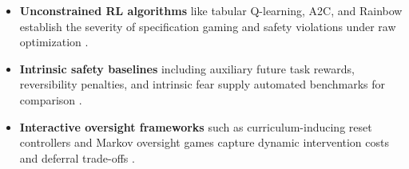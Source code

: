 \begin{itemize}
\item \textbf{Unconstrained RL algorithms} like tabular Q-learning, A2C, and Rainbow establish the severity of specification gaming and safety violations under raw optimization  \cite{Leike2017AI} \cite{Krakovna2020Avoiding} \cite{cCaugatan2026Reward}.
\item \textbf{Intrinsic safety baselines} including auxiliary future task rewards, reversibility penalties, and intrinsic fear supply automated benchmarks for comparison  \cite{Krakovna2020Avoiding} \cite{Krakovna2018Penalizing} \cite{Omi2024Progressive}.
\item \textbf{Interactive oversight frameworks} such as curriculum-inducing reset controllers and Markov oversight games capture dynamic intervention costs and deferral trade-offs  \cite{Omi2024Progressive} \cite{Overman2025The} \cite{Turchetta2020Safe}.
\end{itemize}




